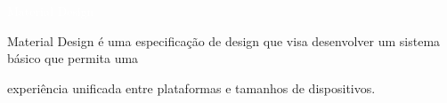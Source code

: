 
\LARGE
\noindent\colorbox{materialBlue}
{\parbox[c][25pt][c]{\textwidth}{\hspace{15pt}\textcolor{white}{Material Design}}} %

\large
\vspace*{10pt}

\textcolor{materialBlue}{Material Design} é uma especificação de design que visa
desenvolver um sistema básico que permita uma

\vspace*{10pt}

experiência unificada entre plataformas e tamanhos de
dispositivos.

\vspace*{10pt}
